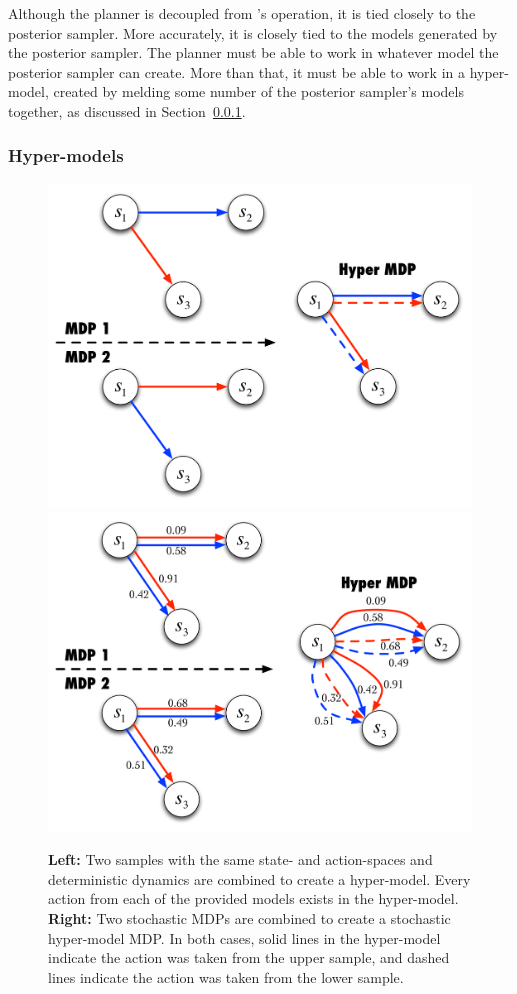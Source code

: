 Although the planner is decoupled from 's operation, it is tied closely to the posterior sampler. More accurately, it is closely tied to the models generated by the posterior sampler. The planner must be able to work in whatever model the posterior sampler can create. More than that, it must be able to work in a hyper-model, created by melding some number of the posterior sampler's models together, as discussed in Section~\ref{boss:alg:gen:hyper}.

\subsubsection{Hyper-models}

\label{boss:alg:gen:hyper}

\begin{figure}[t]
\begin{center}
\includegraphics[width=0.45\linewidth]{hyper-construction}
\includegraphics[width=0.45\linewidth]{hyper-stoch-construction}
\caption{\textbf{Left:} Two samples with the same state- and action-spaces and deterministic dynamics are combined to create a hyper-model. Every action from each of the provided models exists in the hyper-model. \textbf{Right:} Two stochastic MDPs are combined to create a stochastic hyper-model MDP. In both cases, solid lines in the hyper-model indicate the action was taken from the upper sample, and dashed lines indicate the action was taken from the lower sample.}
\label{sec:boss:hyper-model-creation}
\end{center}
\end{figure}



